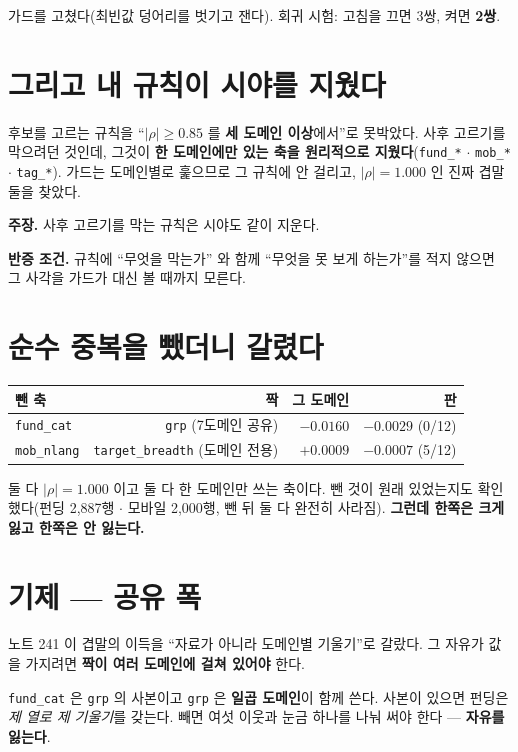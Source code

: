 \documentclass[10pt,a4paper]{article}
\newcommand{\claim}[2]{\begin{claimbox}\textbf{주장.} #1\par\smallskip
  \textcolor{gray!70}{\textbf{반증 조건.} #2}\end{claimbox}}
\begin{document}
가드를 고쳤다(최빈값 덩어리를 벗기고 잰다). 회귀 시험: 고침을 끄면 3쌍,
켜면 \textbf{2쌍}.

\section{그리고 내 규칙이 시야를 지웠다}

후보를 고르는 규칙을 ``$|\rho| \ge 0.85$ 를 \textbf{세 도메인 이상}에서''로
못박았다. 사후 고르기를 막으려던 것인데, 그것이 \textbf{한 도메인에만 있는 축을
원리적으로 지웠다}(\verb|fund_*| $\cdot$ \verb|mob_*| $\cdot$ \verb|tag_*|).
가드는 도메인별로 훑으므로 그 규칙에 안 걸리고, $|\rho| = \mathbf{1.000}$ 인
진짜 겹말 둘을 찾았다.

\claim{사후 고르기를 막는 규칙은 시야도 같이 지운다.}{규칙에 ``무엇을 막는가''
와 함께 ``무엇을 못 보게 하는가''를 적지 않으면 그 사각을 가드가 대신 볼
때까지 모른다.}

\section{순수 중복을 뺐더니 갈렸다}

\begin{center}\small
\begin{tabular}{lrrr}\toprule
뺀 축 & 짝 & 그 도메인 & 판 \\ \midrule
\verb|fund_cat| & \verb|grp| (7도메인 공유) & $\mathbf{-0.0160}$ & $-0.0029$ (0/12) \\
\verb|mob_nlang| & \verb|target_breadth| (도메인 전용) & $+0.0009$ & $-0.0007$ (5/12) \\ \bottomrule
\end{tabular}\end{center}

둘 다 $|\rho| = 1.000$ 이고 둘 다 한 도메인만 쓰는 축이다. 뺀 것이 원래
있었는지도 확인했다(펀딩 2,887행 $\cdot$ 모바일 2,000행, 뺀 뒤 둘 다 완전히
사라짐). \textbf{그런데 한쪽은 크게 잃고 한쪽은 안 잃는다.}

\section{기제 --- 공유 폭}

노트 241 이 겹말의 이득을 ``자료가 아니라 도메인별 기울기''로 갈랐다. 그
자유가 값을 가지려면 \textbf{짝이 여러 도메인에 걸쳐 있어야} 한다.

\verb|fund_cat| 은 \verb|grp| 의 사본이고 \verb|grp| 은 \textbf{일곱 도메인}이
함께 쓴다. 사본이 있으면 펀딩은 \emph{제 열로 제 기울기}를 갖는다. 빼면 여섯
이웃과 눈금 하나를 나눠 써야 한다 --- \textbf{자유를 잃는다}.
\end{document}
